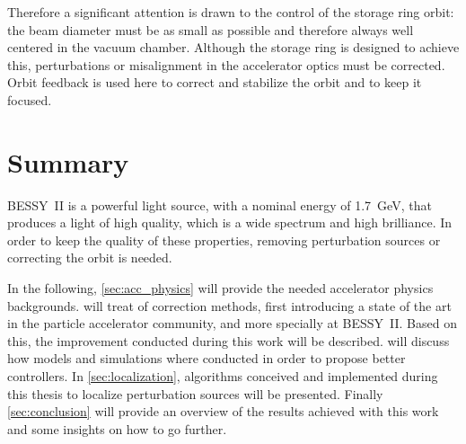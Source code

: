 Therefore a significant attention is drawn to the control of the storage ring orbit: the beam diameter must be as small as possible and therefore always well centered in the vacuum chamber. Although the storage ring is designed to achieve this, perturbations or misalignment in the accelerator optics must be corrected. Orbit feedback is used here to correct and stabilize the orbit and to keep it focused.

\section{Summary}
BESSY~II is a powerful light source, with a nominal energy of \SI{1.7}{\giga\electronvolt}, that produces a light of high quality, which is a wide spectrum and high brilliance. In order to keep the quality of these properties, removing perturbation sources or correcting the orbit is needed.

In the following, \cref{sec:acc_physics} will provide the needed accelerator physics backgrounds.  will treat of correction methods, first introducing a state of the art in the particle accelerator community, and more specially at BESSY~II. Based on this, the improvement conducted during this work will be described.  will discuss how models and simulations where conducted in order to propose better controllers. In \cref{sec:localization}, algorithms conceived and implemented during this thesis to localize perturbation sources will be presented. Finally \cref{sec:conclusion} will provide an overview of the results achieved with this work and some insights on how to go further.
